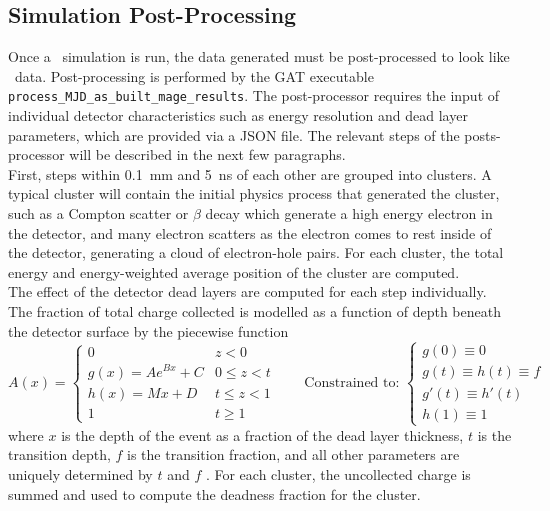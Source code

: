 \documentclass[/main.tex]{subfiles}
\begin{document}
\subsection{Simulation Post-Processing} \label{sec:simpostproc}
Once a \Mage\ simulation is run, the data generated must be post-processed to look like \MJD\ data.
Post-processing is performed by the GAT executable \texttt{process\_MJD\_as\_built\_mage\_results}.
The post-processor requires the input of individual detector characteristics such as energy resolution and dead layer parameters, which are provided via a JSON file.
The relevant steps of the posts-processor will be described in the next few paragraphs.
\\
First, steps within 0.1~mm and 5~ns of each other are grouped into clusters.
A typical cluster will contain the initial physics process that generated the cluster, such as a Compton scatter or $\beta$ decay which generate a high energy electron in the detector, and many electron scatters as the electron comes to rest inside of the detector, generating a cloud of electron-hole pairs.
For each cluster, the total energy and energy-weighted average position of the cluster are computed.
\\
The effect of the detector dead layers are computed for each step individually.
The fraction of total charge collected is modelled as a function of depth beneath the detector surface by the piecewise function
\begin{equation}
  \label{eq:dlmodel}
  A(x) = \begin{cases}
    0 & z < 0 \\
    g(x)=Ae^{Bx} + C & 0 \leq z < t \\
    h(x)=Mx + D & t \leq z < 1 \\
    1 & t \geq 1
  \end{cases}  \qquad
  \text{Constrained to: } \begin{cases}
    g(0)\equiv 0 \\ g(t)\equiv h(t)\equiv f \\ g'(t)\equiv h'(t) \\ h(1)\equiv 1
  \end{cases}
\end{equation}
where $x$ is the depth of the event as a fraction of the dead layer thickness, $t$ is the transition depth, $f$ is the transition fraction, and all other parameters are uniquely determined by $t$ and $f$ \cite{giovenetti2015phd}\cite{buuck2018}.
For each cluster, the uncollected charge is summed and used to compute the deadness fraction for the cluster.
\end{document}
